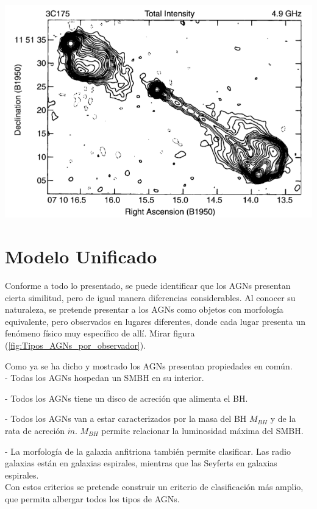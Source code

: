 \includegraphics[scale=.3]{./figures/3_AGNs/Lobulos_y_Jets.png}
\label{fig:Lobulos}


\section{Modelo Unificado}
\label{sec:Unified_models}

Conforme a todo lo presentado, se puede identificar que los AGNs presentan cierta similitud, pero de igual manera diferencias considerables. Al conocer su naturaleza, se pretende presentar a los AGNs como objetos con morfología equivalente, pero observados en lugares diferentes, donde cada lugar presenta un fenómeno físico muy específico de allí. Mirar figura (\ref{fig:Tipos_AGNs_por_observador}).

Como ya se ha dicho y mostrado los AGNs presentan propiedades en común. \\

- Todas los AGNs hospedan un SMBH en su interior. 

- Todos los AGNs tiene un disco de acreción que alimenta el BH.

- Todos los AGNs van a estar caracterizados por la masa del BH $M_{BH}$ y de la rata de acreción $\dot{m}$. $M_{BH}$ permite relacionar la luminosidad máxima del SMBH. 

- La morfología de la galaxia anfitriona también permite clasificar. Las radio galaxias están en galaxias espirales, mientras que las Seyferts en galaxias espirales.\\

Con estos criterios se pretende construir un criterio de clasificación más amplio, que permita albergar todos los tipos de AGNs.





